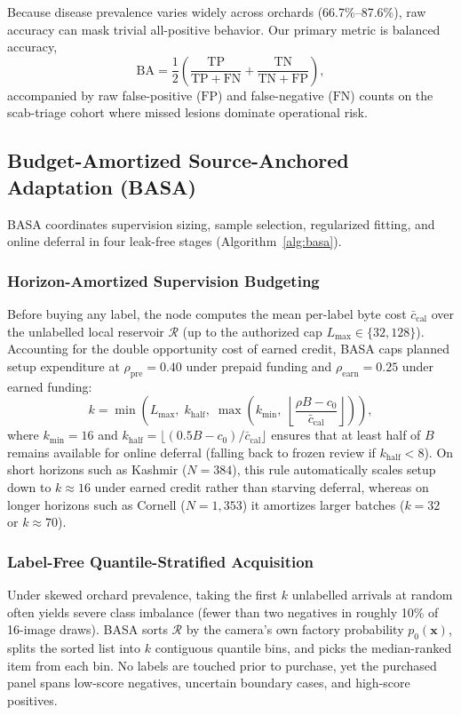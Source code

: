 \documentclass[preprint,12pt,authoryear]{elsarticle}
\newcommand{\BA}{\mathrm{BA}}
\begin{document}
Because disease prevalence varies widely across orchards (66.7\%--87.6\%), raw accuracy can mask trivial all-positive behavior. Our primary metric is balanced accuracy,
\begin{equation}
  \BA = \frac{1}{2}\left(\frac{\mathrm{TP}}{\mathrm{TP}+\mathrm{FN}} + \frac{\mathrm{TN}}{\mathrm{TN}+\mathrm{FP}}\right),
  \label{eq:ba}
\end{equation}
accompanied by raw false-positive ($\mathrm{FP}$) and false-negative ($\mathrm{FN}$) counts on the scab-triage cohort where missed lesions dominate operational risk.

\subsection{Budget-Amortized Source-Anchored Adaptation (BASA)}
\label{sec:basa}

BASA coordinates supervision sizing, sample selection, regularized fitting, and online deferral in four leak-free stages (Algorithm~\ref{alg:basa}).

\subsubsection{Horizon-Amortized Supervision Budgeting}
Before buying any label, the node computes the mean per-label byte cost $\bar{c}_{\mathrm{cal}}$ over the unlabelled local reservoir $\mathcal{R}$ (up to the authorized cap $L_{\max} \in \{32, 128\}$). Accounting for the double opportunity cost of earned credit, BASA caps planned setup expenditure at $\rho_{\mathrm{pre}} = 0.40$ under prepaid funding and $\rho_{\mathrm{earn}} = 0.25$ under earned funding:
\begin{equation}
  k = \min\!\left(L_{\max},\; k_{\mathrm{half}},\; \max\!\left(k_{\min},\; \left\lfloor \frac{\rho B - c_0}{\bar{c}_{\mathrm{cal}}} \right\rfloor\right)\right),
  \label{eq:amort}
\end{equation}
where $k_{\min} = 16$ and $k_{\mathrm{half}} = \lfloor (0.5B - c_0)/\bar{c}_{\mathrm{cal}} \rfloor$ ensures that at least half of $B$ remains available for online deferral (falling back to frozen review if $k_{\mathrm{half}} < 8$). On short horizons such as Kashmir ($N = 384$), this rule automatically scales setup down to $k \approx 16$ under earned credit rather than starving deferral, whereas on longer horizons such as Cornell ($N = 1{,}353$) it amortizes larger batches ($k = 32$ or $k \approx 70$).

\subsubsection{Label-Free Quantile-Stratified Acquisition}
Under skewed orchard prevalence, taking the first $k$ unlabelled arrivals at random often yields severe class imbalance (fewer than two negatives in roughly 10\% of 16-image draws). BASA sorts $\mathcal{R}$ by the camera's own factory probability $p_0(\mathbf{x})$, splits the sorted list into $k$ contiguous quantile bins, and picks the median-ranked item from each bin. No labels are touched prior to purchase, yet the purchased panel spans low-score negatives, uncertain boundary cases, and high-score positives.
\end{document}
